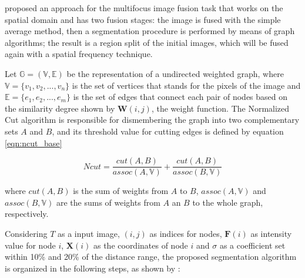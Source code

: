  proposed an approach for the multifocus image fusion task that works on the spatial domain and has two fusion stages: the image is fused with the simple average method, then a segmentation procedure is performed by means of graph algorithms; the result is a region split of the initial images, which will be fused again with a spatial frequency technique.

Let $\mathbb{G} = (\mathbb{V},\mathbb{E})$ be the representation of a undirected weighted graph, where $\mathbb{V} = \{v_{1},v_{2},...,v_{n}\}$ is the set of vertices that stands for the pixels of the image and $\mathbb{E} = \{e_{1},e_{2},...,e_{m}\}$ is the set of edges that connect each pair of nodes based on the similarity degree shown by $\mathbf{W}(i,j)$, the weight function. The Normalized Cut algorithm is responsible for dismembering the graph into two complementary sets $A$ and $B$, and its threshold value for cutting edges is defined by equation \ref{eqn:ncut_base}

\begin{equation}
\label{eqn:ncut_base}
    Ncut = 
    \frac{cut(A,B)}{assoc(A,\mathbb{V})} +
    \frac{cut(A,B)}{assoc(B,\mathbb{V})}
\end{equation}

\noindent where $cut(A,B)$ is the sum of 
weights from $A$ to $B$, $assoc(A,\mathbb{V})$ and $assoc(B,\mathbb{V})$ are the sums of weights from $A$ an $B$ to the whole graph, respectively.

Considering $T$ as a input image, $(i,j)$ as indices for nodes, $\mathbf{F}(i)$ as intensity value for node $i$, $\mathbf{X}(i)$ as the coordinates of node $i$ and $\sigma$ as a coefficient set within 10\% and 20\% of the distance range, the proposed segmentation algorithm is organized in the following steps, as shown by \cite{li2008multifocus}:
    
